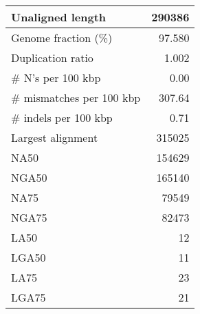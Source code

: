 \documentclass[12pt,a4paper]{article}
\begin{document}
\begin{table}[ht]
\begin{center}
\begin{tabular}{|l*{1}{|r}|}
Unaligned length & 290386 \\ \hline
Genome fraction (\%) & 97.580 \\ \hline
Duplication ratio & 1.002 \\ \hline
\# N's per 100 kbp & 0.00 \\ \hline
\# mismatches per 100 kbp & 307.64 \\ \hline
\# indels per 100 kbp & 0.71 \\ \hline
Largest alignment & 315025 \\ \hline
NA50 & 154629 \\ \hline
NGA50 & 165140 \\ \hline
NA75 & 79549 \\ \hline
NGA75 & 82473 \\ \hline
LA50 & 12 \\ \hline
LGA50 & 11 \\ \hline
LA75 & 23 \\ \hline
LGA75 & 21 \\ \hline
\end{tabular}
\end{center}
\end{table}
\end{document}

